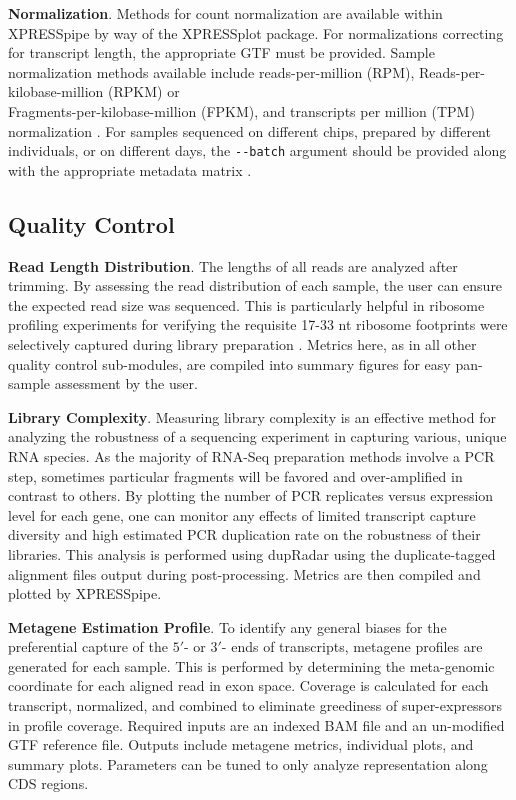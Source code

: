 \documentclass[10pt, oneside]{article}
\begin{document}
\noindent\textbf{Normalization}. Methods for count normalization are available within XPRESSpipe by way of the XPRESSplot package. For normalizations correcting for transcript length, the appropriate GTF must be provided. Sample \\normalization methods available include reads-per-million (RPM), Reads-per-kilobase-million (RPKM) or \\Fragments-per-kilobase-million (FPKM), and transcripts per million (TPM) normalization \cite{evans_briefbio}. For samples sequenced on different chips, prepared by different individuals, or on different days, the \texttt{-{}-batch} argument should be provided along with the appropriate metadata matrix \cite{sva}.\\

\subsection*{Quality Control}
\textbf{Read Length Distribution}. The lengths of all reads are analyzed after trimming. By assessing the read distribution of each sample, the user can ensure the expected read size was sequenced. This is particularly helpful in ribosome profiling experiments for verifying the requisite 17-33 nt ribosome footprints were selectively captured during library preparation \cite{ingolia_meth, fp_range}. Metrics here, as in all other quality control sub-modules, are compiled into summary figures for easy pan-sample assessment by the user. \par

\noindent\textbf{Library Complexity}. Measuring library complexity is an effective method for analyzing the robustness of a sequencing experiment in capturing various, unique RNA species. As the majority of RNA-Seq preparation methods involve a PCR step, sometimes particular fragments will be favored and over-amplified in contrast to others. By plotting the number of PCR replicates versus expression level for each gene, one can monitor any effects of limited transcript capture diversity and high estimated PCR duplication rate on the robustness of their libraries. This analysis is performed using dupRadar \cite{dupradar} using the duplicate-tagged alignment files output during post-processing. Metrics are then compiled and plotted by XPRESSpipe.\par

\noindent\textbf{Metagene Estimation Profile}. To identify any general biases for the preferential capture of the $5'$- or $3'$- ends of transcripts, metagene profiles are generated for each sample. This is performed by determining the meta-genomic coordinate for each aligned read in exon space. Coverage is calculated for each transcript, normalized, and combined to eliminate greediness of super-expressors in profile coverage. Required inputs are an indexed BAM file and an un-modified GTF reference file. Outputs include metagene metrics, individual plots, and summary plots. Parameters can be tuned to only analyze representation along CDS regions.\par
\end{document}
